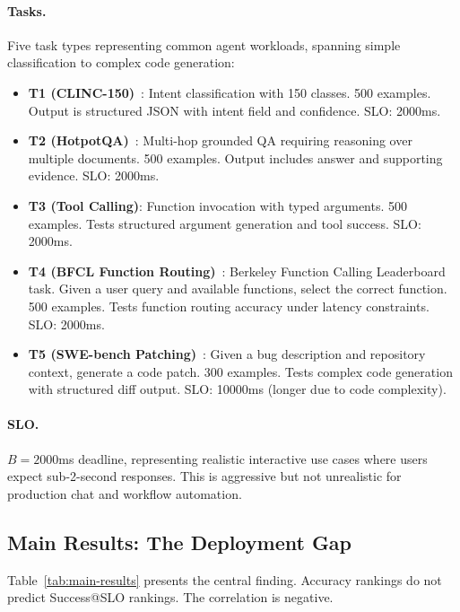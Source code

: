 \documentclass[11pt]{article}
\begin{document}
\paragraph{Tasks.}
Five task types representing common agent workloads, spanning simple classification to complex code generation:
\begin{itemize}[leftmargin=12pt]
    \item \textbf{T1 (CLINC-150)}~\citep{larson2019clinc150}: Intent classification with 150 classes. 500 examples.  Output is structured JSON with intent field and confidence.  SLO: 2000ms.
    \item \textbf{T2 (HotpotQA)}~\citep{yang2018hotpotqa}: Multi-hop grounded QA requiring reasoning over multiple documents. 500 examples.  Output includes answer and supporting evidence.  SLO: 2000ms.
    \item \textbf{T3 (Tool Calling)}: Function invocation with typed arguments. 500 examples.  Tests structured argument generation and tool success.  SLO: 2000ms.
    \item \textbf{T4 (BFCL Function Routing)}~\citep{berkeley2024bfcl}: Berkeley Function Calling Leaderboard task.  Given a user query and available functions, select the correct function. 500 examples.  Tests function routing accuracy under latency constraints.  SLO: 2000ms.
    \item \textbf{T5 (SWE-bench Patching)}~\citep{princeton2024swe}: Given a bug description and repository context, generate a code patch. 300 examples.  Tests complex code generation with structured diff output.  SLO: 10000ms (longer due to code complexity).
\end{itemize}

\paragraph{SLO.}
$B = 2000$ms deadline, representing realistic interactive use cases where users expect sub-2-second responses.
This is aggressive but not unrealistic for production chat and workflow automation.

\subsection{Main Results: The Deployment Gap}

Table~\ref{tab:main-results} presents the central finding.
Accuracy rankings do not predict Success@SLO rankings.
The correlation is negative.
\end{document}
